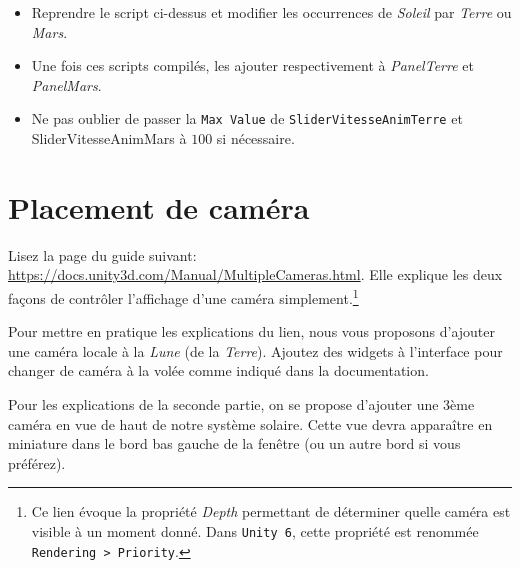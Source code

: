 \documentclass[a4paper,10pt]{article}
\newenvironment{solution}%
{\begin{tcolorbox}[breakable,colback=red!5!white,colframe=red!75!black,title=Solution]}%
{\end{tcolorbox}}
\begin{document}
\begin{solution}
\begin{itemize}
	\item Reprendre le script ci-dessus et modifier les occurrences de \textit{Soleil} par \textit{Terre} ou \textit{Mars}.
	\item Une fois ces scripts compilés, les ajouter respectivement à \textit{PanelTerre} et \textit{PanelMars}.
	\item Ne pas oublier de passer la \texttt{Max Value} de \texttt{SliderVitesseAnimTerre} et SliderVitesseAnimMars à $100$ si nécessaire.
\end{itemize}

\end{solution}
\fi 

\section{Placement de caméra}

Lisez la page du guide suivant: \url{https://docs.unity3d.com/Manual/MultipleCameras.html}. Elle explique les deux façons de contrôler l'affichage d'une caméra simplement.\footnote{Ce lien évoque la propriété \textit{Depth} permettant de déterminer quelle caméra est visible à un moment donné. Dans \texttt{Unity~6}, cette propriété est renommée \texttt{Rendering > Priority}.}

Pour mettre en pratique les explications du lien, nous vous proposons d'ajouter une caméra locale à la \textit{Lune} (de la \textit{Terre}). Ajoutez des widgets à l'interface pour changer de caméra à la volée comme indiqué dans la documentation.

Pour les explications de la seconde partie, on se propose d'ajouter une 3ème caméra en vue de haut de notre système solaire. Cette vue devra apparaître en miniature dans le bord bas gauche de la fenêtre (ou un autre bord si vous préférez).
\end{document}

